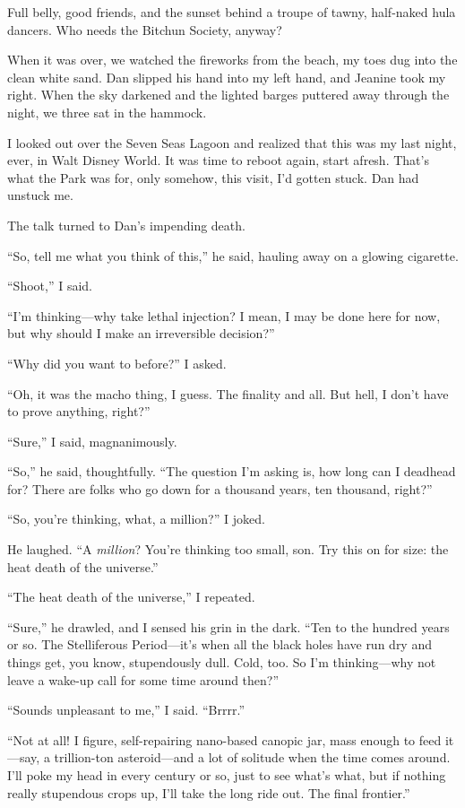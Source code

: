Full belly, good friends, and the sunset behind a troupe of tawny,
half-naked hula dancers. Who needs the Bitchun Society, anyway?

When it was over, we watched the fireworks from the beach, my toes
dug into the clean white sand. Dan slipped his hand into my left
hand, and Jeanine took my right. When the sky darkened and the
lighted barges puttered away through the night, we three sat in the
hammock.

I looked out over the Seven Seas Lagoon and realized that this was
my last night, ever, in Walt Disney World. It was time to reboot
again, start afresh. That's what the Park was for, only somehow,
this visit, I'd gotten stuck. Dan had unstuck me.

The talk turned to Dan's impending death.

“So, tell me what you think of this,” he said, hauling away on a
glowing cigarette.

“Shoot,” I said.

“I'm thinking—why take lethal injection? I mean, I may be done here
for now, but why should I make an irreversible decision?”

“Why did you want to before?” I asked.

“Oh, it was the macho thing, I guess. The finality and all. But
hell, I don't have to prove anything, right?”

“Sure,” I said, magnanimously.

“So,” he said, thoughtfully. “The question I'm asking is, how long
can I deadhead for? There are folks who go down for a thousand
years, ten thousand, right?”

“So, you're thinking, what, a million?” I joked.

He laughed. “A \emph{million}? You're thinking too small, son. Try
this on for size: the heat death of the universe.”

“The heat death of the universe,” I repeated.

“Sure,” he drawled, and I sensed his grin in the dark. “Ten to the
hundred years or so. The Stelliferous Period—it's when all the
black holes have run dry and things get, you know, stupendously
dull. Cold, too. So I'm thinking—why not leave a wake-up call for
some time around then?”

“Sounds unpleasant to me,” I said. “Brrrr.”

“Not at all! I figure, self-repairing nano-based canopic jar, mass
enough to feed it—say, a trillion-ton asteroid—and a lot of
solitude when the time comes around. I'll poke my head in every
century or so, just to see what's what, but if nothing really
stupendous crops up, I'll take the long ride out. The final
frontier.”

